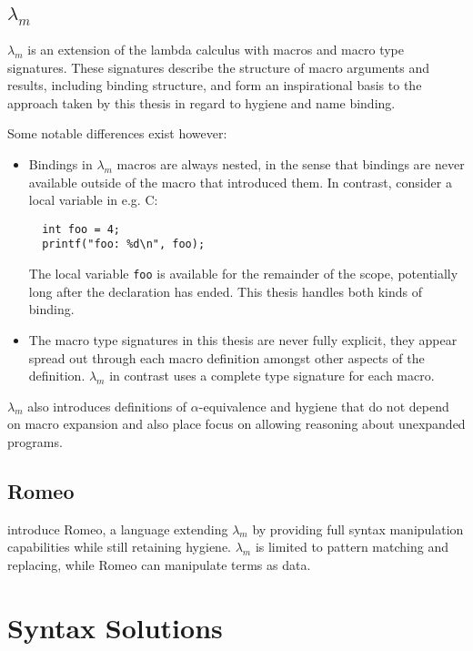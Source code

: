 \documentclass{kththesis}
\begin{document}
\subsection{$\lambda_m$}

$\lambda_m$ \cite{Herman2010} is an extension of the lambda calculus with macros and macro type signatures. These signatures describe the structure of macro arguments and results, including binding structure, and form an inspirational basis to the approach taken by this thesis in regard to hygiene and name binding.

Some notable differences exist however:
\begin{itemize}
  \item Bindings in $\lambda_m$ macros are always nested, in the sense that bindings are never available outside of the macro that introduced them. In contrast, consider a local variable in e.g. C:
  \begin{verbatim}
  int foo = 4;
  printf("foo: %d\n", foo);
  \end{verbatim}
  The local variable \texttt{foo} is available for the remainder of the scope, potentially long after the declaration has ended. This thesis handles both kinds of binding.
  \item The macro type signatures in this thesis are never fully explicit, they appear spread out through each macro definition amongst other aspects of the definition. $\lambda_m$ in contrast uses a complete type signature for each macro.
\end{itemize}

$\lambda_m$ also introduces definitions of $\alpha$-equivalence and hygiene that do not depend on macro expansion and also place focus on allowing reasoning about unexpanded programs.

\subsection{Romeo}

\textcite{Stansifer2014} introduce Romeo, a language extending $\lambda_m$ by providing full syntax manipulation capabilities while still retaining hygiene. $\lambda_m$ is limited to pattern matching and replacing, while Romeo can manipulate terms as data.

\section{Syntax Solutions} \label{sec:syntax-solutions}
\end{document}
